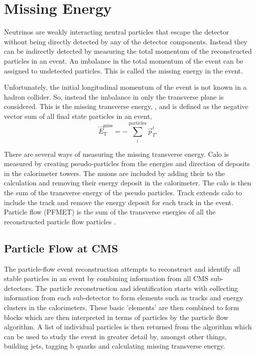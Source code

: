 \section{Missing Energy} 
Neutrinos are weakly interacting neutral particles that escape the
detector without being directly detected by any of the detector components. 
Instead they can be indirectly detected by measuring the total momentum of the
reconstructed particles in an event.
An imbalance in the total momentum of the event can be assigned to undetected
particles. This is called the missing energy in the event.

Unfortunately, the initial longitudinal momentum of the event is not known in a
hadron collider. So, instead the imbalance in only the transverse plane is
considered. This is the missing transverse energy, \ETm, and is defined as
the negative vector sum of all final state particles in an event,
\begin{equation}
\vec{E}^{\text{miss}}_{\text{T}} = -\sum_i^{\text{particles}} \vec{p}_{T}^{i}.
\end{equation}

There are several ways of measuring the missing transverse energy.
Calo \ETm is measured by creating pseudo-particles from the energies and
direction of deposits in the calorimeter towers. The muons are included by
adding their \Pt to the calculation and removing their energy deposit in the
calorimeter. The calo \ETm is then the sum of the transverse energy of the
pseudo particles.
Track \ETm extends calo \ETm to include the track \Pt and remove the energy
deposit for each track in the event.
Particle flow \ETm (PFMET) is the sum of the transverse energies of all the
reconstructed particle flow particles \cite{PF}.

\subsection{Particle Flow at CMS}

The particle-flow event reconstruction attempts to reconstruct and identify all
stable particles in an event by combining information from all CMS
sub-detectors. The particle reconstruction and identification starts with
collecting information from each sub-detector to form elements such as tracks
and energy clusters in the calorimeters. These basic 'elements' are then
combined to form blocks which are then interpreted in terms of particles by the
particle flow algorithm. A list of individual particles is then returned from
the algorithm which can be used to study the event in greater detail by,
amongst other things, building jets, tagging b quarks and calculating missing
transverse energy\cite{PF}.

